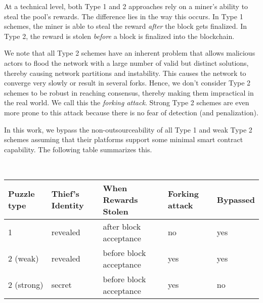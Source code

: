 \documentclass[runningheads]{llncs}
\begin{document}
At a technical level, both Type 1 and 2 approaches rely on a miner's ability to steal the pool's rewards. The difference lies in the way this occurs. In Type 1 schemes, the miner is able to steal the reward {\em after} the block gets finalized.
In Type 2, 
the reward is stolen {\em before} a block is finalized into the blockchain. 


We note that all Type 2 schemes have an inherent problem that allows malicious actors to flood the network with a large number of valid but distinct solutions, thereby causing network partitions and instability. This causes the network to converge very slowly or result in several forks. Hence, we don't consider Type 2 schemes to be robust in reaching consensus, thereby making them impractical in the real world. We call this the {\em forking attack}. Strong Type 2 schemes are even more prone to this attack because there is no fear of detection (and penalization).

In this work, we bypass the non-outsourceability of all Type 1 and weak Type 2 schemes assuming that their platforms support
some minimal smart contract capability. The following table summarizes this. 

~\\
	\begin{tabular}{|l|l|l|l|l|}\hline
		  Puzzle type     & Thief's Identity   & When Rewards Stolen       & Forking attack &Bypassed \\\hline
		  1        & revealed              & after block acceptance   & no & yes             \\
		  2 (weak)   & revealed           & before block acceptance  & yes &yes            \\
		  2 (strong) & secret           & before block acceptance  & yes & no      \\\hline
	\end{tabular}
\end{document}
